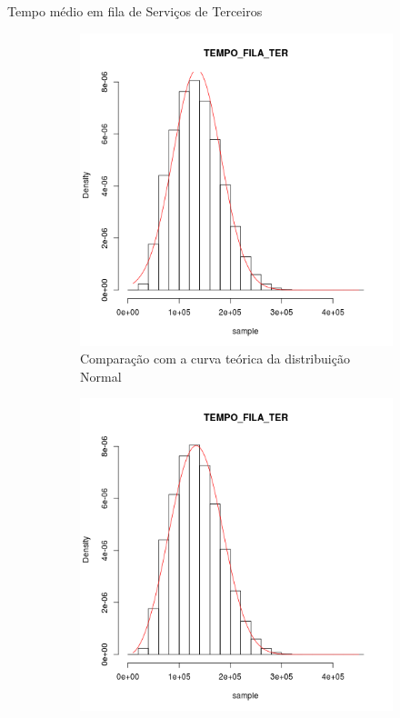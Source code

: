 \documentclass[xcolor=dvipsnames]{beamer}
\begin{document}
\begin{frame}{Tempo médio em fila de Serviços de Terceiros}
	\begin{figure}[H]
		\centering
		\begin{subfigure}[H]{0.4\textwidth}
			\includegraphics[width=\textwidth]{img/C1-hist-norm-TEMPO_FILA_TER.png}
			\caption{Comparação com a curva teórica da distribuição Normal}
			\label{fig:C1-norm}
		\end{subfigure}
		\begin{subfigure}[H]{0.4\textwidth}
			\includegraphics[width=\textwidth]{img/C1-hist-weibull-TEMPO_FILA_TER.png}

\end{subfigure}
\end{figure}
\end{frame}
\end{document}
